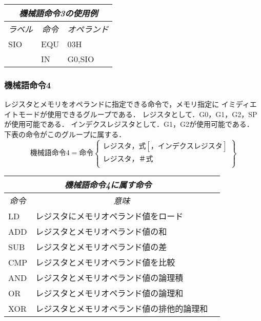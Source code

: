 \begin{center}
\tt\begin{tabular}{lll}
\hline
\multicolumn{3}{c}{\it 機械語命令3の使用例} \\
\hline
\multicolumn{1}{c}{\it ラベル} & 
        \multicolumn{1}{c}{\it 命令} & \multicolumn{1}{c}{\it オペランド} \\
SIO  & EQU &  03H \\
     & IN  &  G0,SIO \\
\hline
\end{tabular}
\end{center}
\vspace{0.2cm}

\subsubsection{機械語命令4}
レジスタとメモリをオペランドに指定できる命令で，メモリ指定に
イミディエイトモードが使用できるグループである．
レジスタとして．G0，G1，G2，SPが使用可能である．
インデクスレジスタとして．G1，G2が使用可能である．
下表の命令がこのグループに属する．
\[ 機械語命令4 = 命令　\left\{
  \begin{array}{c}
   レジスタ，式　[，インデクスレジスタ] \\
   レジスタ，＃式 \\
  \end{array}  
 \right\}
 \]
\begin{center}
\begin{tabular}{lll}
\hline
\multicolumn{2}{c}{\it 機械語命令4に属す命令} \\
\hline
\multicolumn{1}{c}{\it 命令} & \multicolumn{1}{c}{\it 意味} \\
LD & レジスタにメモリオペランド値をロード \\
ADD & レジスタとメモリオペランド値の和 \\
SUB & レジスタとメモリオペランド値の差 \\
CMP & レジスタとメモリオペランド値を比較 \\
AND & レジスタとメモリオペランド値の論理積 \\
OR & レジスタとメモリオペランド値の論理和 \\
XOR & レジスタとメモリオペランド値の排他的論理和 \\
\hline
\end{tabular}
\end{center}
\vspace{0.2cm}

